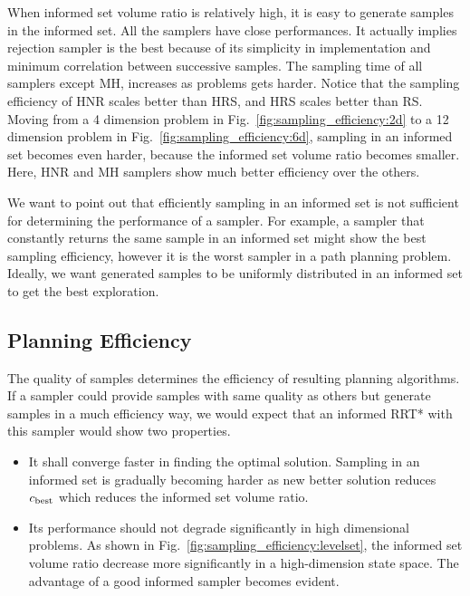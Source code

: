 \documentclass[letterpaper, 10 pt, conference]{ieeeconf}  %
\begin{document}
When informed set volume ratio is relatively high, it is easy to generate samples in the informed set.
All the samplers have close performances.
It actually implies rejection sampler is the best because of its simplicity in implementation and minimum correlation between successive samples.
The sampling time of all samplers except MH, increases as problems gets harder.
Notice that the sampling efficiency of HNR scales better than HRS, and HRS scales better than RS.
Moving from a 4 dimension problem in Fig.~\ref{fig:sampling_efficiency:2d} to a 12 dimension problem in Fig.~\ref{fig:sampling_efficiency:6d}, sampling in an informed set becomes even harder, because the informed set volume ratio becomes smaller.
Here, HNR and MH samplers show much better efficiency over the others.

We want to point out that efficiently sampling in an informed set is not sufficient for determining the performance of a sampler.
For example, a sampler that constantly returns the same sample in an informed set might show the best sampling efficiency, however it is the worst sampler in a path planning problem.
Ideally, we want generated samples to be uniformly distributed in an informed set to get the best exploration.

\subsection{Planning Efficiency}

The quality of samples determines the efficiency of resulting planning algorithms.
If a sampler could provide samples with same quality as others but generate samples in a much efficiency way, we would expect that an informed RRT* with this sampler would show two properties.
\begin{itemize}
	\item It shall converge faster in finding the optimal solution.
	Sampling in an informed set is gradually becoming harder as new better solution reduces $ c_{\rm best} $ which reduces the informed set volume ratio.
	\item Its performance should not degrade significantly in high dimensional problems.
	As shown in Fig.~\ref{fig:sampling_efficiency:levelset}, the informed set volume ratio decrease more significantly in a high-dimension state space.
	The advantage of a good informed sampler becomes evident.
\end{itemize}
\end{document}
